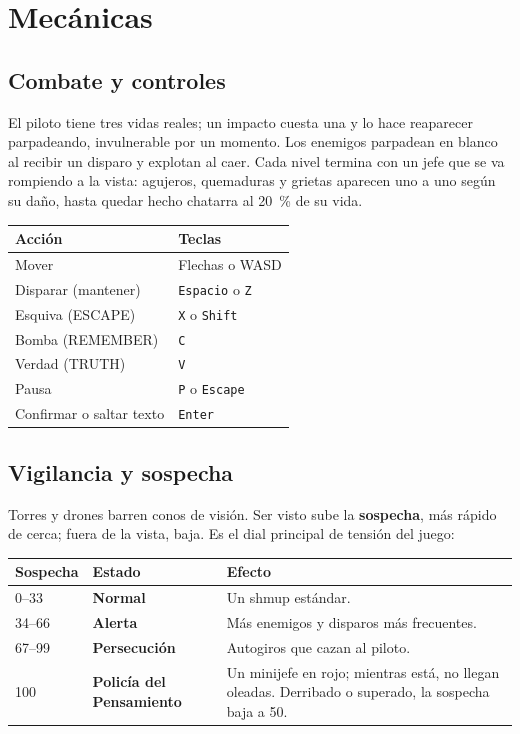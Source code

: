 \documentclass[11pt,a4paper]{article}
\begin{document}
\section{Mecánicas}

\subsection{Combate y controles}

El piloto tiene tres vidas reales; un impacto cuesta una y lo hace reaparecer parpadeando, invulnerable por un momento. Los enemigos parpadean en blanco al recibir un disparo y explotan al caer. Cada nivel termina con un jefe que se va rompiendo a la vista: agujeros, quemaduras y grietas aparecen uno a uno según su daño, hasta quedar hecho chatarra al 20~\% de su vida.

\begin{center}
\begin{tabularx}{0.8\textwidth}{L l}
  \toprule
  \textbf{Acción} & \textbf{Teclas} \\
  \midrule
  Mover & Flechas o WASD \\
  Disparar (mantener) & \texttt{Espacio} o \texttt{Z} \\
  Esquiva (ESCAPE) & \texttt{X} o \texttt{Shift} \\
  Bomba (REMEMBER) & \texttt{C} \\
  Verdad (TRUTH) & \texttt{V} \\
  Pausa & \texttt{P} o \texttt{Escape} \\
  Confirmar o saltar texto & \texttt{Enter} \\
  \bottomrule
\end{tabularx}
\end{center}

\subsection{Vigilancia y sospecha}

Torres y drones barren conos de visión. Ser visto sube la \textbf{sospecha}, más rápido de cerca; fuera de la vista, baja. Es el dial principal de tensión del juego:

\begin{center}
\begin{tabularx}{\textwidth}{l >{\bfseries}l L}
  \toprule
  \textbf{Sospecha} & \textbf{Estado} & \textbf{Efecto} \\
  –33 & Normal & Un shmup estándar. \\
  34–66 & Alerta & Más enemigos y disparos más frecuentes. \\
  67–99 & Persecución & Autogiros que cazan al piloto. \\
  100 & Policía del Pensamiento & Un minijefe en rojo; mientras está, no llegan oleadas. Derribado o superado, la sospecha baja a 50. \\
  \bottomrule
\end{tabularx}
\end{center}
\end{document}
